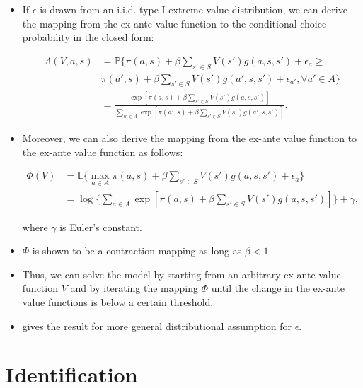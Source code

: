\documentclass[]{book}
\providecommand{\tightlist}{%
  \setlength{\itemsep}{0pt}\setlength{\parskip}{0pt}}
\begin{document}
\begin{itemize}
\tightlist
\item
  If \(\epsilon\) is drawn from an i.i.d. type-I extreme value
  distribution, we can derive the mapping from the ex-ante value
  function to the conditional choice probability in the closed form:

  \begin{equation}
  \begin{split}
  \Lambda(V, a, s) &= \mathbb{P}\{\pi(a , s) + \beta \sum_{s' \in S} V(s') g(a, s, s') + \epsilon_{a} \ge\\
   & \pi(a' , s) + \beta \sum_{s' \in S} V(s') g(a', s, s') + \epsilon_{a'}, \forall a' \in A\}\\
  &=\frac{\exp[\pi(a , s) + \beta \sum_{s' \in S} V(s') g(a, s, s')]}{\sum_{a' \in A} \exp[\pi(a' , s) + \beta \sum_{s' \in S} V(s') g(a', s, s')]}.
  \end{split}
  \end{equation}
\item
  Moreover, we can also derive the mapping from the ex-ante value
  function to the ex-ante value function as follows:

  \begin{equation}
  \begin{split}
  \Phi(V) &= \mathbb{E}\{\max_{a \in A} \pi(a , s) + \beta \sum_{s' \in S} V(s') g(a, s, s') + \epsilon_{a}\} \\
  &=\log \Bigg\{\sum_{a \in A} \exp[\pi(a , s) + \beta \sum_{s' \in S} V(s') g(a, s, s')] \Bigg\} + \gamma,
  \end{split}
  \end{equation}

  where \(\gamma\) is Euler's constant.
\item
  \(\Phi\) is shown to be a contraction mapping as long as
  \(\beta < 1\).
\item
  Thus, we can solve the model by starting from an arbitrary ex-ante
  value function \(V\) and by iterating the mapping \(\Phi\) until the
  change in the ex-ante value functions is below a certain threshold.
\item
  \citet{rustOptimalReplacementGMC1987} gives the result for more
  general distributional assumption for \(\epsilon\).
\end{itemize}

\section{Identification}\label{identification}
\end{document}

